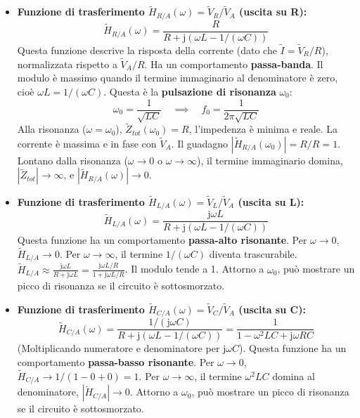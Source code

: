 \documentclass[a4paper, 11pt]{article}
\newcommand{\jj}{\mathrm{j}} %
\newcommand{\abs}[1]{\left|#1\right|}
\begin{document}
\begin{itemize}
    \item \textbf{Funzione di trasferimento $\tilde{H}_{R/A}(\omega) = \tilde{V}_R / \tilde{V}_A$ (uscita su R):}
        \begin{equation} \label{eq:H_RLC_R}
            \tilde{H}_{R/A}(\omega) = \frac{R}{R + \jj (\omega L - 1/(\omega C))}
        \end{equation}
        Questa funzione descrive la risposta della corrente (dato che $\tilde{I} = \tilde{V}_R/R$), normalizzata rispetto a $\tilde{V}_A/R$. Ha un comportamento \textbf{passa-banda}.
        Il modulo è massimo quando il termine immaginario al denominatore è zero, cioè $\omega L = 1/(\omega C)$. Questa è la \textbf{pulsazione di risonanza} $\omega_0$:
        \begin{equation}
            \omega_0 = \frac{1}{\sqrt{LC}} \quad \implies \quad f_0 = \frac{1}{2\pi\sqrt{LC}}
        \end{equation}
        Alla risonanza ($\omega = \omega_0$), $\tilde{Z}_{tot}(\omega_0) = R$, l'impedenza è minima e reale. La corrente è massima e in fase con $\tilde{V}_A$. Il guadagno $\abs{\tilde{H}_{R/A}(\omega_0)} = R/R = 1$.
        Lontano dalla risonanza ($\omega \to 0$ o $\omega \to \infty$), il termine immaginario domina, $\abs{\tilde{Z}_{tot}} \to \infty$, e $\abs{\tilde{H}_{R/A}(\omega)} \to 0$.

    \item \textbf{Funzione di trasferimento $\tilde{H}_{L/A}(\omega) = \tilde{V}_L / \tilde{V}_A$ (uscita su L):}
        \begin{equation} \label{eq:H_RLC_L}
            \tilde{H}_{L/A}(\omega) = \frac{\jj \omega L}{R + \jj (\omega L - 1/(\omega C))}
        \end{equation}
        Questa funzione ha un comportamento \textbf{passa-alto risonante}.
        Per $\omega \to 0$, $\tilde{H}_{L/A} \to 0$.
        Per $\omega \to \infty$, il termine $1/(\omega C)$ diventa trascurabile. $\tilde{H}_{L/A} \approx \frac{\jj \omega L}{R + \jj \omega L} = \frac{\jj \omega L/R}{1 + \jj \omega L/R}$. Il modulo tende a 1.
        Attorno a $\omega_0$, può mostrare un picco di risonanza se il circuito è sottosmorzato.

    \item \textbf{Funzione di trasferimento $\tilde{H}_{C/A}(\omega) = \tilde{V}_C / \tilde{V}_A$ (uscita su C):}
        \begin{equation} \label{eq:H_RLC_C}
            \tilde{H}_{C/A}(\omega) = \frac{1/(\jj \omega C)}{R + \jj (\omega L - 1/(\omega C))} = \frac{1}{1 - \omega^2 LC + \jj \omega RC}
        \end{equation}
        (Moltiplicando numeratore e denominatore per $\jj \omega C$). Questa funzione ha un comportamento \textbf{passa-basso risonante}.
        Per $\omega \to 0$, $\tilde{H}_{C/A} \to 1 / (1 - 0 + 0) = 1$.
        Per $\omega \to \infty$, il termine $\omega^2 LC$ domina al denominatore, $\abs{\tilde{H}_{C/A}} \to 0$.
        Attorno a $\omega_0$, può mostrare un picco di risonanza se il circuito è sottosmorzato.
\end{itemize}
\end{document}
